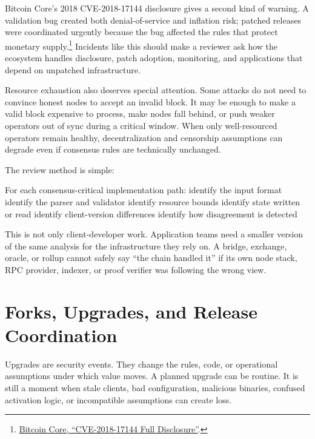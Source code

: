 Bitcoin Core's 2018 CVE-2018-17144 disclosure gives a second kind of warning. A validation bug created both denial-of-service and inflation risk; patched releases were coordinated urgently because the bug affected the rules that protect monetary supply.\footnote{\href{https://bitcoincore.org/en/2018/09/20/notice/}{Bitcoin Core, ``CVE-2018-17144 Full Disclosure''}.} Incidents like this should make a reviewer ask how the ecosystem handles disclosure, patch adoption, monitoring, and applications that depend on unpatched infrastructure.

Resource exhaustion also deserves special attention. Some attacks do not need to convince honest nodes to accept an invalid block. It may be enough to make a valid block expensive to process, make nodes fall behind, or push weaker operators out of sync during a critical window. When only well-resourced operators remain healthy, decentralization and censorship assumptions can degrade even if consensus rules are technically unchanged.

The review method is simple:

\begin{codeblock}
For each consensus-critical implementation path:
    identify the input format
    identify the parser and validator
    identify resource bounds
    identify state written or read
    identify client-version differences
    identify how disagreement is detected
\end{codeblock}

This is not only client-developer work. Application teams need a smaller version of the same analysis for the infrastructure they rely on. A bridge, exchange, oracle, or rollup cannot safely say ``the chain handled it'' if its own node stack, RPC provider, indexer, or proof verifier was following the wrong view.

\section{Forks, Upgrades, and Release Coordination}

Upgrades are security events. They change the rules, code, or operational assumptions under which value moves. A planned upgrade can be routine. It is still a moment when stale clients, bad configuration, malicious binaries, confused activation logic, or incompatible assumptions can create loss.

